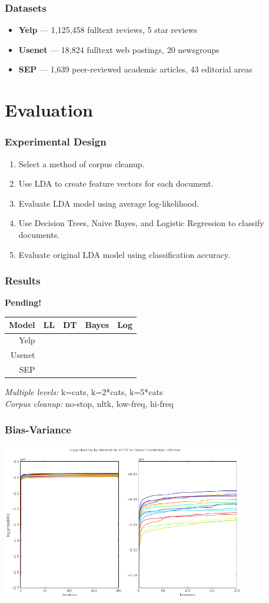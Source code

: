 \documentclass[t]{beamer}
\begin{document}
\begin{frame}
\frametitle{Datasets}
\begin{itemize}
\item \textbf{Yelp} --- 1,125,458 fulltext reviews, 5 star reviews
\item \textbf{Usenet} --- 18,824 fulltext web postings, 20 newsgroups
\item \textbf{SEP} --- 1,639 peer-reviewed academic articles, 43 editorial areas
\end{itemize}
\end{frame}

\section{Evaluation}
\begin{frame}
\frametitle{Experimental Design}
\begin{enumerate}
\item Select a method of corpus cleanup.
\item Use LDA to create feature vectors for each document.
\item Evaluate LDA model using average log-likelihood.
\item Use Decision Trees, Naive Bayes, and Logistic Regression to classify documents. 
\item Evaluate original LDA model using classification accuracy. 
\end{enumerate}
\end{frame}

\begin{frame}
\frametitle{Results}
\textbf{Pending!}
\bigskip
\begin{tabular}{r|cccc}
Model   & LL & DT   & Bayes  & Log \\ \hline
Yelp    &     &      &        & \\
Usenet  &     &      &        & \\
SEP     &     &      &        & 
\end{tabular}
\pause \bigskip
\textit{Multiple levels:} k=cats, k=2*cats, k=5*cats \\
\textit{Corpus cleanup:} no-stop, nltk, low-freq, hi-freq
\end{frame}

\begin{frame}
\frametitle{Bias-Variance}

\includegraphics[width=0.8\textwidth]{img/darwin-ll.png}

\end{frame}
\end{document}
